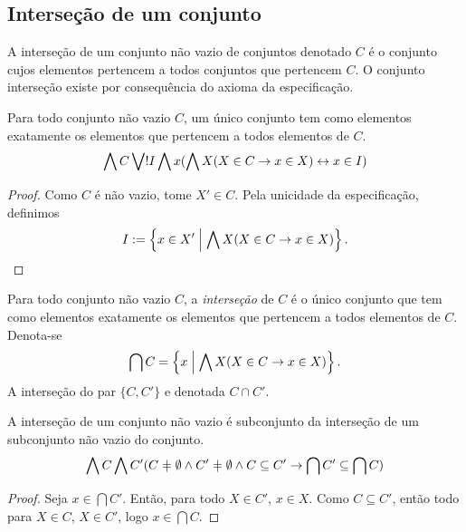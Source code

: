 \subsection{Interseção de um conjunto}

A interseção de um conjunto não vazio de conjuntos denotado $C$ é o conjunto cujos elementos pertencem a todos conjuntos que pertencem $C$. O conjunto interseção existe por consequência do axioma da especificação.

\begin{proposition}
Para todo conjunto não vazio $C$, um único conjunto tem como elementos exatamente os elementos que pertencem a todos elementos de $C$.
	\begin{equation*}
	\bigwedge\nolimits C \bigvee\nolimits! I \bigwedge\nolimits x(\bigwedge\nolimits X(X \in C \rightarrow x \in X) \leftrightarrow x \in I)
	\end{equation*}
\end{proposition}
\begin{proof}
Como $C$ é não vazio, tome $X' \in C$. Pela unicidade da especificação, definimos
	\begin{equation*}
	I := \left\{{x \in X'}\;\middle\vert\;{\bigwedge\nolimits X(X \in C \rightarrow x \in X)}\right\}. \qedhere
	\end{equation*}
\end{proof}

\begin{definition}
Para todo conjunto não vazio $C$, a \emph{interseção} de $C$ é o único conjunto que tem como elementos exatamente os elementos que pertencem a todos elementos de $C$. Denota-se
	\begin{equation*}
	\bigcap C = \left\{{x}\;\middle\vert\;{\bigwedge\nolimits X(X \in C \rightarrow x \in X)}\right\}.
	\end{equation*}
A interseção do par $\{C,C'\}$ e denotada $C \cap C'$.
\end{definition}

\begin{proposition}
A interseção de um conjunto não vazio é subconjunto da interseção de um subconjunto não vazio do conjunto.
	\begin{equation*}
	\forall C \forall C' (C \neq \emptyset \lee C' \neq \emptyset \lee C \subseteq C' \limplica \bigcap C' \subseteq \bigcap C)
	\end{equation*}
\end{proposition}
\begin{proof}
Seja $x \in \bigcap C'$. Então, para todo $X \in C'$, $x \in X$. Como $C \subseteq C'$, então todo para $X \in C$, $X \in C'$, logo $x \in \bigcap C$.
\end{proof}

